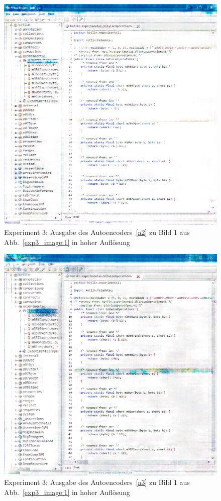 \begin{figure} [ht]
  \centering
  \includegraphics[width=\textwidth]{bilder/result_exp3/1_pred_a2.png}

  \caption{Experiment 3: Ausgabe des Autoencoders~\ref{a2} zu Bild 1 aus Abb.~\ref{exp3_image:1} in hoher Auflösung}
\end{figure}

\begin{figure} [ht]
  \centering
  \includegraphics[width=\textwidth]{bilder/result_exp3/1_pred_a3.png}

  \caption{Experiment 3: Ausgabe des Autoencoders~\ref{a3} zu Bild 1 aus Abb.~\ref{exp3_image:1} in hoher Auflösung}
\end{figure}

